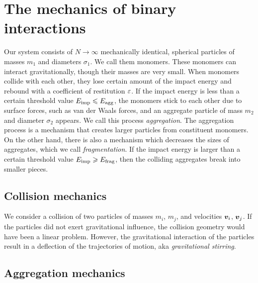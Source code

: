 \documentclass[aps,prl,preprint,groupedaddress,10pt]{revtex4-2}
\begin{document}
\section{The mechanics of binary interactions}
Our system consists of $N\to\infty$ mechanically identical, spherical particles of masses 
$m_1$ and diameters $\sigma_1$. We call them monomers. These monomers can interact 
gravitationally, though their masses are very small. When monomers collide with each other,
they lose certain amount of the impact energy and rebound with a coefficient of 
restitution $\varepsilon$. If the impact energy is less than a certain threshold value 
$E_{\mathrm{imp}}\leqslant E_{\mathrm{agg}}$, the monomers stick to each other due to surface 
forces, such as van der Waals forces, and an aggregate particle of mass $m_2$ and diameter
$\sigma_2$ appears. We call this process \emph{aggregation}. The aggregation process is a 
mechanism that creates larger particles from constituent monomers. On the other hand, 
there is also a mechanism which decreases the sizes of aggregates, which we call 
\emph{fragmentation}. If the impact energy is larger than a certain threshold value 
$E_{\mathrm{imp}}\geqslant E_{\mathrm{frag}}$, then the colliding aggregates break into smaller 
pieces. 

\subsection{Collision mechanics}
We consider a collision of two particles of masses $m_i$, $m_j$, and velocities $\vb*{v}_i$, 
$\vb*{v}_j$. If the particles did not exert gravitational influence, the collision 
geometry would have been a linear problem. However, the gravitational interaction of 
the particles result in a deflection of the trajectories of motion, aka 
\emph{gravitational stirring}.


\subsection{Aggregation mechanics}




    
\end{document}
